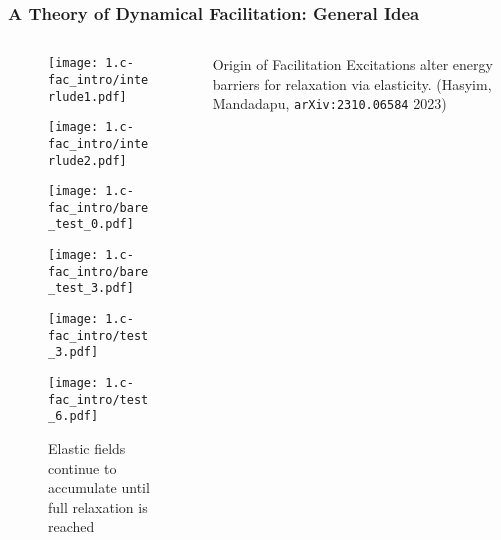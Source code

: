 
\begin{frame}\label{d.1}
\frametitle{A Theory of Dynamical Facilitation: General Idea}

\begin{columns}[T]
\begin{column}[T]{0.5\textwidth}

\begin{figure}[t]
\begin{overprint}
\vspace{-10pt}
\texttt{[image: 1.c-fac\_intro/interlude1.pdf]}\caption{So far, we only discuss the first hopping event!}

\texttt{[image: 1.c-fac\_intro/interlude2.pdf]}\caption{Relaxation involves traversing a series of ISs and energy barriers.}

\texttt{[image: 1.c-fac\_intro/bare\_test\_0.pdf]}\vspace{-10pt}\caption{A system always begins with no excitations.}

\texttt{[image: 1.c-fac\_intro/bare\_test\_3.pdf]}\vspace{-10pt}\caption{More excitations are created over time, anywhere in space.}

\texttt{[image: 1.c-fac\_intro/test\_3.pdf]}\vspace{-10pt}\caption{Excitations leave behind \textbf{elastic fields}.}

\texttt{[image: 1.c-fac\_intro/test\_6.pdf]}\vspace{-10pt}\caption{Elastic fields continue to accumulate until full relaxation is reached}

\end{overprint}
\end{figure}

\end{column}

\begin{column}[T]{0.5\textwidth}
\vspace{-12pt}
\begin{block}{\centering \large Origin of Facilitation}
\centering Excitations alter energy barriers for relaxation via elasticity.
{\footnotesize (Hasyim, Mandadapu,  \texttt{arXiv:2310.06584} 2023)}
\end{block}


\end{column}
\end{columns}
\end{frame}
